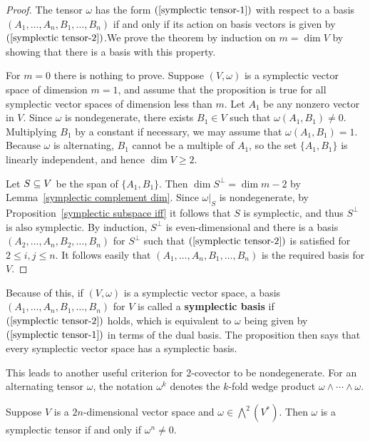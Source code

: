 \begin{proof}
The tensor $\omega$ has the form $(\ref{symplectic tensor-1})$ with respect to a basis $(A_1,\dots,A_n,B_1,\dots,B_n)$ if and only if its action on basis vectors is given by $(\ref{symplectic tensor-2})$.We prove the theorem by induction on $m=\dim V$ by showing that there is a basis with this property.\par
For $m=0$ there is nothing to prove. Suppose $(V,\omega)$ is a symplectic vector space of dimension $m=1$, and assume that the proposition is true for all symplectic vector spaces of dimension less than $m$. Let $A_1$ be any nonzero vector in $V$. Since $\omega$ is nondegenerate, there exists $B_1\in V$ such that $\omega(A_1,B_1)\neq0$. Multiplying $B_1$ by a constant if necessary, we may assume that $\omega(A_1,B_1)=1$. Because $\omega$ is alternating, $B_1$ cannot be a multiple of $A_1$, so the set $\{A_1,B_1\}$ is linearly independent, and hence $\dim V\geq2$.\par
Let $S\subseteq V$ be the span of $\{A_1,B_1\}$. Then $\dim S^\bot=\dim m-2$ by Lemma~\ref{symplectic complement dim}. Since $\omega|_S$ is nondegenerate, by Proposition~\ref{symplectic subspace iff} it follows that $S$ is symplectic, and thus $S^\bot$ is also symplectic. By induction, $S^\bot$ is even-dimensional and there is a basis $(A_2,\dots,A_n,B_2,\dots,B_n)$ for $S^\bot$ such that $(\ref{symplectic tensor-2})$ is satisfied for $2\leq i,j\leq n$. It follows easily that $(A_1,\dots,A_n,B_1,\dots,B_n)$ is the required basis for $V$.
\end{proof}
Because of this, if $(V,\omega)$ is a symplectic vector space, a basis $(A_1,\dots,A_n,B_1,\dots,B_n)$ for $V$ is called a \textbf{symplectic basis} if $(\ref{symplectic tensor-2})$ holds, which is equivalent to $\omega$ being given by $(\ref{symplectic tensor-1})$ in terms of the dual basis. The proposition then says that every symplectic vector space has a symplectic basis.\par
This leads to another useful criterion for $2$-covector to be nondegenerate. For an alternating tensor $\omega$, the notation $\omega^k$ denotes the $k$-fold wedge product $\omega\wedge\cdots\wedge\omega$.
\begin{proposition}\label{symplectic tensor iff n-fold product nonzero}
Suppose $V$ is a $2n$-dimensional vector space and $\omega\in\bigwedge^2(V^*)$. Then $\omega$ is a symplectic tensor if and only if $\omega^n\neq 0$.
\end{proposition}
